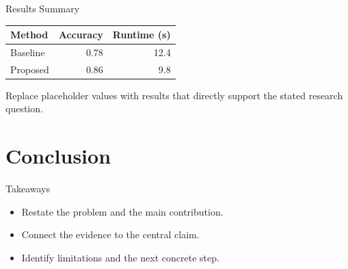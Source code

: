 \begin{slide}{Results Summary}
  \begin{center}
    \begin{tabular}{lrr}
      \toprule
      Method & Accuracy & Runtime (s) \\
      \midrule
      Baseline & 0.78 & 12.4 \\
      Proposed & 0.86 & 9.8 \\
      \bottomrule
    \end{tabular}
  \end{center}

  \bigskip
  Replace placeholder values with results that directly support the stated
  research question.
\end{slide}

\section{Conclusion}

\begin{slide}{Takeaways}
  \begin{itemize}
    \item Restate the problem and the main contribution.
    \item Connect the evidence to the central claim.
    \item Identify limitations and the next concrete step.
  \end{itemize}
\end{slide}
